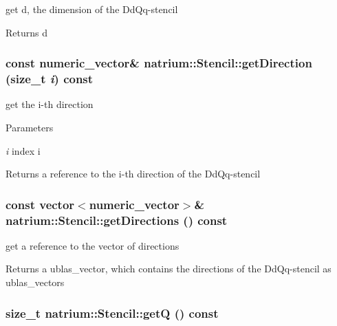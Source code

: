 get d, the dimension of the DdQq-\/stencil \begin{DoxyReturn}{Returns}
d 
\end{DoxyReturn}
\hypertarget{classnatrium_1_1Stencil_a76b179032543b3436dea199beceab000}{
\subsubsection[{getDirection}]{\setlength{\rightskip}{0pt plus 5cm}const {\bf numeric\_\-vector}\& natrium::Stencil::getDirection (size\_\-t {\em i}) const}}
\label{classnatrium_1_1Stencil_a76b179032543b3436dea199beceab000}


get the i-\/th direction 
\begin{DoxyParams}{Parameters}
\item[{\em i}]index i \end{DoxyParams}
\begin{DoxyReturn}{Returns}
a reference to the i-\/th direction of the DdQq-\/stencil 
\end{DoxyReturn}
\hypertarget{classnatrium_1_1Stencil_a02dbfdb70b94a32f477a6ac57ed14f5e}{
\subsubsection[{getDirections}]{\setlength{\rightskip}{0pt plus 5cm}const vector$<${\bf numeric\_\-vector}$>$\& natrium::Stencil::getDirections () const}}
\label{classnatrium_1_1Stencil_a02dbfdb70b94a32f477a6ac57ed14f5e}


get a reference to the vector of directions \begin{DoxyReturn}{Returns}
a ublas\_\-vector, which contains the directions of the DdQq-\/stencil as ublas\_\-vectors 
\end{DoxyReturn}
\hypertarget{classnatrium_1_1Stencil_a9c42c1e1fbc5308a8ba1281eb5e4be18}{
\subsubsection[{getQ}]{\setlength{\rightskip}{0pt plus 5cm}size\_\-t natrium::Stencil::getQ () const}}
\label{classnatrium_1_1Stencil_a9c42c1e1fbc5308a8ba1281eb5e4be18}


